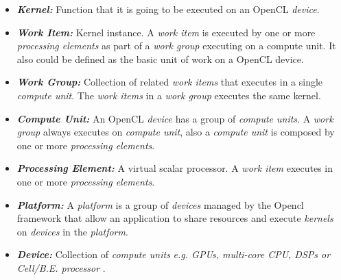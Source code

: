 
\begin{itemize}
    \item\textbf{\textit{Kernel:}} Function that it is going to be executed on an OpenCL \emph{device}\cite{opencl12}. 

    \item\textbf{\textit{Work Item:}} Kernel instance. A \emph{work item} is executed by one or more \emph{processing elements} as 
        part of a \emph{work group} executing on a compute unit\cite{opencl12}. It also could be defined as the basic unit of work
        on a OpenCL device\cite{intro_opencl}.

    \item\textbf{\textit{Work Group:}} Collection of related \emph{work items} that executes in a single \emph{compute unit}. The 
        \emph{work items} in a \emph{work group} executes the same kernel\cite{opencl12}.

    \item\textbf{\textit{Compute Unit:}} An OpenCL \emph{device} has a group of \emph{compute units}. A \emph{work group} always
        executes on \emph{compute unit}, also a \emph{compute unit} is composed by one or more 
        \emph{processing elements}\cite{opencl12}.

    \item\textbf{\textit{Processing Element:}} A virtual scalar processor. A \emph{work item} executes in one or more 
        \emph{processing elements}\cite{opencl12}.

    \item\textbf{\textit{Platform:}} A \emph{platform} is a group of \emph{devices} managed by the Opencl framework 
        that allow an application to share resources and execute \emph{kernels} on \emph{devices} in the 
        \emph{platform}\cite{opencl12}.

    \item\textbf{\textit{Device:}} Collection of \emph{compute units} \emph{e.g. GPUs, multi-core CPU, DSPs or Cell/B.E. processor}
        \cite{opencl12}.
\end{itemize}





